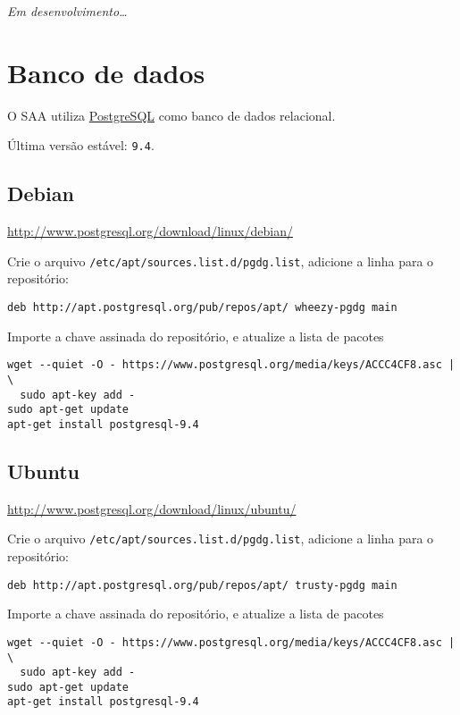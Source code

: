 \emph{Em desenvolvimento\ldots{}}

\section{Banco de dados}\label{banco-de-dados}

O SAA utiliza \href{http://www.postgresql.org/}{PostgreSQL} como banco
de dados relacional.

Última versão estável: \texttt{9.4}.

\subsection{Debian}\label{debian}

\url{http://www.postgresql.org/download/linux/debian/}

Crie o arquivo \texttt{/etc/apt/sources.list.d/pgdg.list}, adicione a
linha para o repositório:

\begin{verbatim}
deb http://apt.postgresql.org/pub/repos/apt/ wheezy-pgdg main
\end{verbatim}

Importe a chave assinada do repositório, e atualize a lista de pacotes

\begin{verbatim}
wget --quiet -O - https://www.postgresql.org/media/keys/ACCC4CF8.asc | \
  sudo apt-key add -
sudo apt-get update
apt-get install postgresql-9.4
\end{verbatim}

\subsection{Ubuntu}\label{ubuntu}

\url{http://www.postgresql.org/download/linux/ubuntu/}

Crie o arquivo \texttt{/etc/apt/sources.list.d/pgdg.list}, adicione a
linha para o repositório:

\begin{verbatim}
deb http://apt.postgresql.org/pub/repos/apt/ trusty-pgdg main
\end{verbatim}

Importe a chave assinada do repositório, e atualize a lista de pacotes

\begin{verbatim}
wget --quiet -O - https://www.postgresql.org/media/keys/ACCC4CF8.asc | \
  sudo apt-key add -
sudo apt-get update
apt-get install postgresql-9.4
\end{verbatim}

